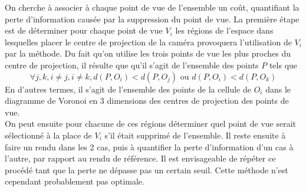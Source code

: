 On cherche à associer à chaque point de vue de l'ensemble un coût, quantifiant la perte d'information causée par la suppression du point de vue.
La première étape est de déterminer pour chaque point de vue $V_i$ les régions de l'espace dans lesquelles placer le centre de projection de la caméra
provoquera l'utilisation de $V_i$ par la méthode. Du fait qu'on utilise les trois points de vue les plus proches du centre de projection,
il résulte que qu'il s'agit de l'ensemble des points $P$ tels que \[\forall{}j,k,i\neq{}j,i\neq{}k, d(P,O_i) < d(P,O_j) \text{ ou } d(P,O_i) < d(P,O_k)\]
En d'autres termes, il s'agit de l'ensemble des points de la cellule de $O_i$ dans le diagramme de Voronoi en 3 dimensions des centres de projection des
points de vue.\\
On peut ensuite pour chacune de ces régions déterminer quel point de vue serait sélectionné à la place de $V_i$ s'il était supprimé de l'ensemble.
Il reste ensuite à faire un rendu dans les 2 cas, puis à quantifier la perte d'information d'un cas à l'autre, par rapport au rendu de référence.
Il est envisageable de répéter ce procédé tant que la perte ne dépasse pas un certain seuil. Cette méthode n'est cependant probablement pas optimale.

